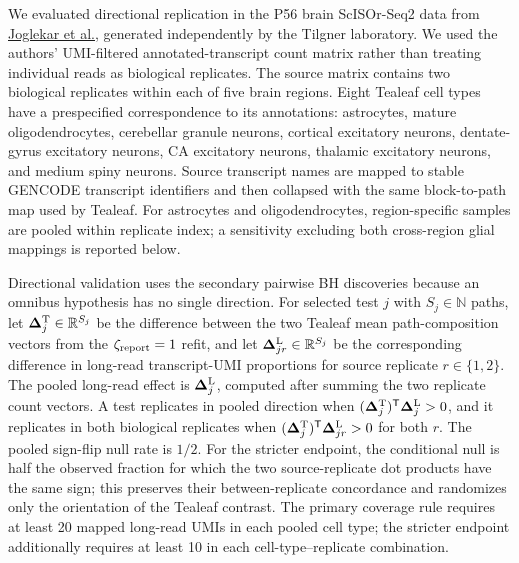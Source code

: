 \documentclass[11pt]{article}
\begin{document}
We evaluated directional replication in the P56 brain ScISOr-Seq2 data from \href{https://doi.org/10.1038/s41593-024-01616-4}{Joglekar et al.}, generated independently by the Tilgner laboratory. We used the authors' UMI-filtered annotated-transcript count matrix rather than treating individual reads as biological replicates. The source matrix contains two biological replicates within each of five brain regions. Eight Tealeaf cell types have a prespecified correspondence to its annotations: astrocytes, mature oligodendrocytes, cerebellar granule neurons, cortical excitatory neurons, dentate-gyrus excitatory neurons, CA excitatory neurons, thalamic excitatory neurons, and medium spiny neurons. Source transcript names are mapped to stable GENCODE transcript identifiers and then collapsed with the same block-to-path map used by Tealeaf. For astrocytes and oligodendrocytes, region-specific samples are pooled within replicate index; a sensitivity excluding both cross-region glial mappings is reported below.

Directional validation uses the secondary pairwise BH discoveries because an omnibus hypothesis has no single direction. For selected test \(j\) with \(S_j\in\mathbb N\) paths, let \(\bm\Delta_j^{\rm T}\in\mathbb R^{S_j}\) be the difference between the two Tealeaf mean path-composition vectors from the \(\zeta_{\rm report}=1\) refit, and let \(\bm\Delta_{jr}^{\rm L}\in\mathbb R^{S_j}\) be the corresponding difference in long-read transcript-UMI proportions for source replicate \(r\in\{1,2\}\). The pooled long-read effect is \(\bm\Delta_j^{\rm L}\), computed after summing the two replicate count vectors. A test replicates in pooled direction when \((\bm\Delta_j^{\rm T})^{\mathsf T}\bm\Delta_j^{\rm L}>0\), and it replicates in both biological replicates when \((\bm\Delta_j^{\rm T})^{\mathsf T}\bm\Delta_{jr}^{\rm L}>0\) for both \(r\). The pooled sign-flip null rate is \(1/2\). For the stricter endpoint, the conditional null is half the observed fraction for which the two source-replicate dot products have the same sign; this preserves their between-replicate concordance and randomizes only the orientation of the Tealeaf contrast. The primary coverage rule requires at least 20 mapped long-read UMIs in each pooled cell type; the stricter endpoint additionally requires at least 10 in each cell-type--replicate combination.
\end{document}
